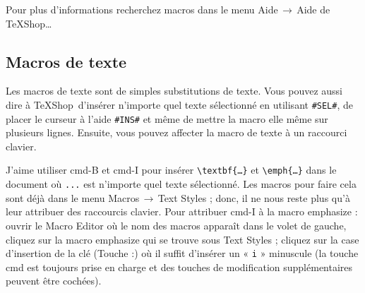 \documentclass[11pt,french]{article}
\newcommand{\TS}{\textsf{\TeX Shop}}
\newcommand{\cmd}[1]{\textsf{#1}}
\newcommand{\mnu}[1]{\textsf{#1}}
\newcommand{\To}{\,\(\to\)\,}
\begin{document}

Pour plus d'informations recherchez \cmd{macros} dans le menu \mnu{Aide}\To\mnu{Aide de TeXShop…}


\subsection{Macros de texte}

Les macros de texte sont de simples substitutions de texte. Vous pouvez aussi dire à \TS\ d'insérer n'importe quel texte sélectionné en utilisant \verb|#SEL#|, de placer le curseur à l'aide \verb|#INS#| et même de mettre la macro elle même sur plusieurs lignes. Ensuite, vous pouvez affecter la macro de texte à un raccourci clavier.

J'aime utiliser \cmd{cmd-B} et \cmd{cmd-I} pour insérer \verb|\textbf{…}| et \verb|\emph{…}| dans le document où \texttt {...} est n'importe quel texte sélectionné. Les macros pour faire cela sont déjà dans le menu \mnu{Macros}\To\mnu{Text Styles} ; donc, il ne nous reste plus qu'à leur attribuer des raccourcis clavier. Pour attribuer \cmd{cmd-I} à la macro \mnu{emphasize} : ouvrir le \mnu{Macro Editor} où le nom des macros apparaît dans le volet de gauche, cliquez sur la macro \mnu{emphasize} qui se trouve sous \mnu{Text Styles} ; cliquez sur la case d'insertion de la clé (\mnu{Touche :}) où il suffit d'insérer un « \texttt{i} » minuscule (la touche \cmd{cmd} est toujours prise en charge et des touches de modification supplémentaires peuvent être cochées).
\end{document}
